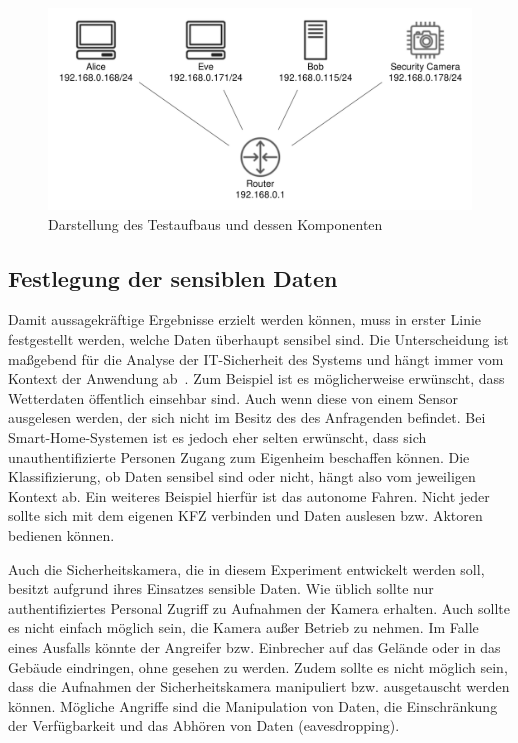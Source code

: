 \begin{figure}
  \centering
  \includegraphics[width=\textwidth]{images/testing-setup}
  \caption{Darstellung des Testaufbaus und dessen Komponenten}
  \label{fig:testing-setup}
\end{figure}

\subsection{Festlegung der sensiblen Daten}
Damit aussagekräftige Ergebnisse erzielt werden können, muss in erster Linie
festgestellt werden, welche Daten überhaupt sensibel sind. Die Unterscheidung
ist maßgebend für die Analyse der IT-Sicherheit des Systems und hängt immer vom
Kontext der Anwendung ab~\cite{paper}. Zum Beispiel ist es möglicherweise
erwünscht, dass Wetterdaten öffentlich einsehbar sind. Auch wenn diese
von einem Sensor ausgelesen werden, der sich nicht im Besitz des des Anfragenden
befindet. Bei Smart-Home-Systemen ist es jedoch eher selten erwünscht, dass sich
unauthentifizierte Personen Zugang zum Eigenheim beschaffen können. Die
Klassifizierung, ob Daten sensibel sind oder nicht, hängt also vom jeweiligen
Kontext ab. Ein weiteres Beispiel hierfür ist das autonome Fahren. Nicht jeder
sollte sich mit dem eigenen KFZ verbinden und Daten auslesen bzw. Aktoren
bedienen können.

Auch die Sicherheitskamera, die in diesem Experiment entwickelt werden soll,
besitzt aufgrund ihres Einsatzes sensible Daten. Wie üblich sollte nur
authentifiziertes Personal Zugriff zu Aufnahmen der Kamera erhalten. Auch sollte
es nicht einfach möglich sein, die Kamera außer Betrieb zu nehmen. Im Falle
eines Ausfalls könnte der Angreifer bzw. Einbrecher auf das Gelände oder in das
Gebäude eindringen, ohne gesehen zu werden. Zudem sollte es nicht möglich sein,
dass die Aufnahmen der Sicherheitskamera manipuliert bzw. ausgetauscht werden
können. Mögliche Angriffe sind die Manipulation von Daten, die Einschränkung der
Verfügbarkeit und das Abhören von Daten (eavesdropping).
